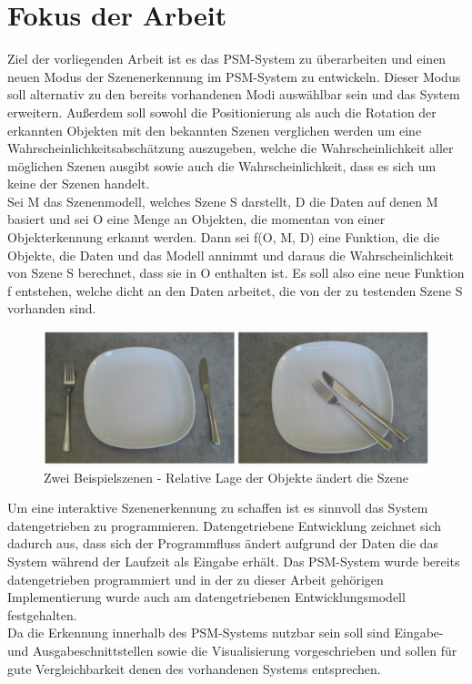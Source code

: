 \section{Fokus der Arbeit}
Ziel der vorliegenden Arbeit ist es das PSM-System zu überarbeiten und einen neuen Modus der Szenenerkennung im PSM-System zu entwickeln. Dieser Modus soll alternativ zu den bereits vorhandenen Modi auswählbar sein und das System erweitern. Außerdem soll sowohl die Positionierung als auch die Rotation der erkannten Objekten mit den bekannten Szenen verglichen werden um eine Wahrscheinlichkeitsabschätzung auszugeben, welche die Wahrscheinlichkeit aller möglichen Szenen ausgibt sowie auch die Wahrscheinlichkeit, dass es sich um keine der Szenen  handelt.\smallskip\\
Sei M das Szenenmodell, welches Szene S darstellt, D die Daten auf denen M basiert und sei O eine Menge an Objekten, die momentan von einer Objekterkennung erkannt werden. Dann sei f(O, M,  D) eine Funktion, die die Objekte, die Daten und das Modell annimmt und daraus die Wahrscheinlichkeit von Szene S berechnet, dass sie in O enthalten ist. Es soll also eine neue Funktion f entstehen, welche dicht an den Daten arbeitet, die von der zu testenden Szene S vorhanden sind.\smallskip\\
\begin{figure}
	\centering
	\includegraphics[width=14cm]{bilder/SzenenBeispiel.pdf}
	\caption{Zwei Beispielszenen - Relative Lage der Objekte ändert die Szene \cite{gehrung14}}
	\label{img:relativeLage}
\end{figure}
Um eine interaktive Szenenerkennung zu schaffen ist es sinnvoll das System datengetrieben zu programmieren. Datengetriebene Entwicklung zeichnet sich dadurch aus, dass sich der Programmfluss ändert aufgrund der Daten die das System während der Laufzeit als Eingabe erhält. Das PSM-System wurde bereits datengetrieben programmiert und in der zu dieser Arbeit gehörigen Implementierung wurde auch am datengetriebenen Entwicklungsmodell festgehalten.\smallskip\\ 
Da die Erkennung innerhalb des PSM-Systems nutzbar sein soll sind Eingabe- und Ausgabeschnittstellen sowie die Visualisierung vorgeschrieben und sollen für gute Vergleichbarkeit denen des vorhandenen Systems entsprechen.\smallskip\\
